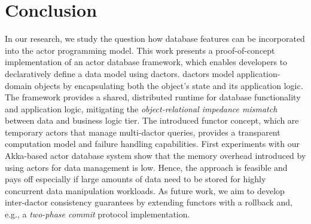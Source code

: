 
\section{Conclusion}\label{sec:conclusion}

In our research, we study the question how database features can be incorporated into the actor programming model. This work presents a proof-of-concept implementation of an actor database framework, which enables developers to declaratively define a data model using \glspl{dactor}.
\Glspl{dactor} model application-domain objects by encapsulating both the object's state and its application logic.
The framework provides a shared, distributed runtime for database functionality and application logic, mitigating the \textit{object-relational impedance mismatch} between data and business logic tier.
The introduced \gls{functor} concept, which are temporary actors that manage multi-\gls{dactor} queries, provides a transparent computation model and failure handling capabilities.
First experiments with our Akka-based actor database system show that the memory overhead introduced by using actors for data management is low.
Hence, the approach is feasible and pays off especially if large amounts of data need to be stored for highly concurrent data manipulation workloads.
As future work, we aim to develop inter-\gls{dactor} consistency guarantees by extending \glspl{functor} with a rollback and, e.g., a \textit{two-phase commit} protocol implementation.

